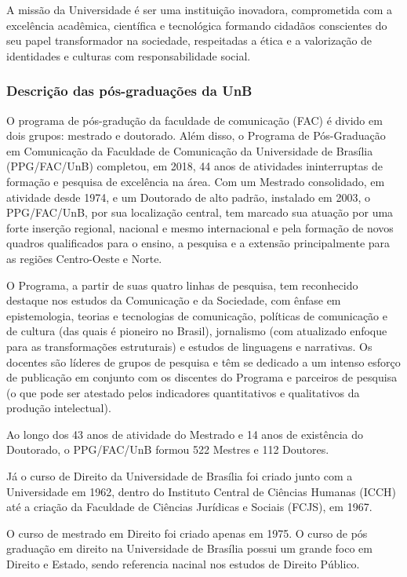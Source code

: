 \documentclass[]{article}
\begin{document}
A missão da Universidade é ser uma instituição inovadora, comprometida
com a excelência acadêmica, científica e tecnológica formando cidadãos
conscientes do seu papel transformador na sociedade, respeitadas a ética
e a valorização de identidades e culturas com responsabilidade social.

\subsubsection{Descrição das pós-graduações da
UnB}\label{descricao-das-pos-graduacoes-da-unb}

O programa de pós-gradução da faculdade de comunicação (FAC) é divido em
dois grupos: mestrado e doutorado. Além disso, o Programa de
Pós-Graduação em Comunicação da Faculdade de Comunicação da Universidade
de Brasília (PPG/FAC/UnB) completou, em 2018, 44 anos de atividades
ininterruptas de formação e pesquisa de excelência na área. Com um
Mestrado consolidado, em atividade desde 1974, e um Doutorado de alto
padrão, instalado em 2003, o PPG/FAC/UnB, por sua localização central,
tem marcado sua atuação por uma forte inserção regional, nacional e
mesmo internacional e pela formação de novos quadros qualificados para o
ensino, a pesquisa e a extensão principalmente para as regiões
Centro-Oeste e Norte.

O Programa, a partir de suas quatro linhas de pesquisa, tem reconhecido
destaque nos estudos da Comunicação e da Sociedade, com ênfase em
epistemologia, teorias e tecnologias de comunicação, políticas de
comunicação e de cultura (das quais é pioneiro no Brasil), jornalismo
(com atualizado enfoque para as transformações estruturais) e estudos de
linguagens e narrativas. Os docentes são líderes de grupos de pesquisa e
têm se dedicado a um intenso esforço de publicação em conjunto com os
discentes do Programa e parceiros de pesquisa (o que pode ser atestado
pelos indicadores quantitativos e qualitativos da produção intelectual).

Ao longo dos 43 anos de atividade do Mestrado e 14 anos de existência do
Doutorado, o PPG/FAC/UnB formou 522 Mestres e 112 Doutores.

Já o curso de Direito da Universidade de Brasília foi criado junto com a
Universidade em 1962, dentro do Instituto Central de Ciências Humanas
(ICCH) até a criação da Faculdade de Ciências Jurídicas e Sociais
(FCJS), em 1967.

O curso de mestrado em Direito foi criado apenas em 1975. O curso de pós
graduação em direito na Universidade de Brasília possui um grande foco
em Direito e Estado, sendo referencia nacinal nos estudos de Direito
Público.
\end{document}
